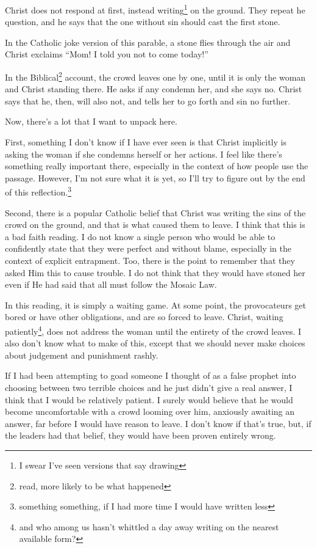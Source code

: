 \documentclass[12pt]{article}[titlepage]
\newcommand{\say}[1]{``#1''}
\renewcommand{\,}{\textsuperscript{,}}
\begin{document}
Christ does not respond at first, instead writing\footnote{I swear I've seen versions that say drawing} on the ground.  
They repeat he question, and he says that the one without sin should cast the first stone.

In the Catholic joke version of this parable, a stone flies through the air and Christ exclaims \say{Mom! I told you not to come today!}

In the Biblical\footnote{read, more likely to be what happened} account, the crowd leaves one by one, until it is only the woman and Christ standing there.  
He asks if any condemn her, and she says no.  
Christ says that he, then, will also not, and tells her to go forth and sin no further.

Now, there's a lot that I want to unpack here.

First, something I don't know if I have ever seen is that Christ implicitly is asking the woman if she condemns herself or her actions.  
I feel like there's something really important there, especially in the context of how people use the passage.  
However, I'm not sure what it is yet, so I'll try to figure out by the end of this reflection.\footnote{something something, if I had more time I would have written less}

Second, there is a popular Catholic belief that Christ was writing the sins of the crowd on the ground, and that is what caused them to leave.  
I think that this is a bad faith reading.  
I do not know a single person who would be able to confidently state that they were perfect and without blame, especially in the context of explicit entrapment.  
Too, there is the point to remember that they asked Him this to cause trouble.  
I do not think that they would have stoned her even if He had said that all must follow the Mosaic Law.

In this reading, it is simply a waiting game.  
At some point, the provocateurs get bored or have other obligations, and are so forced to leave.  
Christ, waiting patiently\footnote{and who among us hasn't whittled a day away writing on the nearest available form?}, does not address the woman until the entirety of the crowd leaves.  
I also don't know what to make of this, except that we should never make choices about judgement and punishment rashly.

If I had been attempting to goad someone I thought of as a false prophet into choosing between two terrible choices and he just didn't give a real answer, I think that I would be relatively patient.  
I surely would believe that he would become uncomfortable with a crowd looming over him, anxiously awaiting an answer, far before I would have reason to leave.  
I don't know if that's true, but, if the leaders had that belief, they would have been proven entirely wrong.
\end{document}
